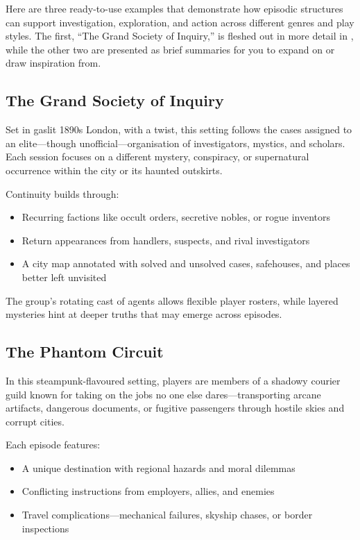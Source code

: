 Here are three ready-to-use examples that demonstrate how episodic structures can support investigation, exploration, and action across different genres and play styles. The first, “The Grand Society of Inquiry,” is fleshed out in more detail in , while the other two are presented as brief summaries for you to expand on or draw inspiration from.

\subsection*{The Grand Society of Inquiry}

Set in gaslit 1890s London, with a twist, this setting follows the cases assigned to an elite—though unofficial—organisation of investigators, mystics, and scholars. Each session focuses on a different mystery, conspiracy, or supernatural occurrence within the city or its haunted outskirts.

\vspace{0.5\baselineskip}
\noindent
Continuity builds through:
\begin{itemize}
    \item Recurring factions like occult orders, secretive nobles, or rogue inventors
    \item Return appearances from handlers, suspects, and rival investigators
    \item A city map annotated with solved and unsolved cases, safehouses, and places better left unvisited
\end{itemize}

\vspace{0.5\baselineskip}
\noindent
The group’s rotating cast of agents allows flexible player rosters, while layered mysteries hint at deeper truths that may emerge across episodes.

\subsection*{The Phantom Circuit}

In this steampunk-flavoured setting, players are members of a shadowy courier guild known for taking on the jobs no one else dares—transporting arcane artifacts, dangerous documents, or fugitive passengers through hostile skies and corrupt cities.

\vspace{0.5\baselineskip}
\noindent
Each episode features:
\begin{itemize}
    \item A unique destination with regional hazards and moral dilemmas
    \item Conflicting instructions from employers, allies, and enemies
    \item Travel complications—mechanical failures, skyship chases, or border inspections
\end{itemize}

